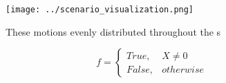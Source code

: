 \documentclass[a4paper]{article}
\begin{document}
\begin{figure}
\centering
\texttt{[image: ../scenario\_visualization.png]}
\caption{These motions evenly distributed throughout the s
}
\end{figure}
 
\begin{equation}   f =
\begin{cases} True, & X \neq 0\\
False, & otherwise
\end{cases}
\end{equation}
\end{document}
